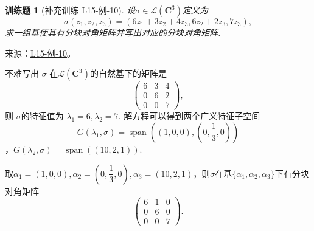 \documentclass[12pt,fontset=fandol]{ctexart}
\newtheorem{exercise}{训练题}[section]
\begin{document}
\begin{exercise}[补充训练 L15-例-10]\label{prob:L15-例-10}
设$\sigma\in \mathcal{L}(\mathbf{C}^3)$定义为
    \[\sigma(z_1,z_2,z_3)=(6z_1+3z_2+4z_3,6z_2+2z_3,7z_3),\]求一组基使其有分块对角矩阵并写出对应的分块对角矩阵.
\end{exercise}
\noindent 来源：\href{https://github.com/yhwu-is/Linear-Algebra-Left-Undone/blob/new/%E8%AE%B2%E4%B9%89/%E4%B8%93%E9%A2%98/15%20%E7%9B%B8%E4%BC%BC%E6%A0%87%E5%87%86%E5%BD%A2%EF%BC%9A%E5%A4%8D%E6%95%B0%E5%9F%9F%E4%B8%8A%E7%9A%84%E5%B0%9D%E8%AF%95%E4%B8%8E%E7%90%86%E8%AE%BA.tex}{L15-例-10}。
\begin{solve}
不难写出 $\sigma$ 在$\mathcal{L}(\mathbf{C}^3)$的自然基下的矩阵是
    \[ \begin{pmatrix}
        6 & 3 & 4 \\
        0 & 6 & 2 \\
        0 & 0 & 7
    \end{pmatrix}, \]
    则 $\sigma$的特征值为 $\lambda_1 = 6,\lambda_2 = 7$. 解方程可以得到两个广义特征子空间 \[G(\lambda_1,\sigma) = \operatorname{span}\left((1,0,0),\left(0,\dfrac{1}{3},0\right)\right)\]，$G(\lambda_2,\sigma)=\operatorname{span}((10,2,1))$.

    取$\alpha_1=(1,0,0),\alpha_2=\left(0,\dfrac{1}{3},0\right),\alpha_3=(10,2,1)$，则$\sigma$在基$\{\alpha_1,\alpha_2,\alpha_3\}$下有分块对角矩阵
    \[ \begin{pmatrix}
        6 & 1 & 0 \\
        0 & 6 & 0 \\
        0 & 0 & 7
    \end{pmatrix}. \]
\end{solve}
\end{document}
